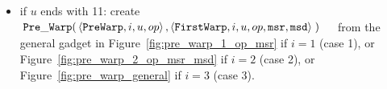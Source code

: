\begin{itemize}
\begin{itemize}
            \item if $u$ ends with 11:
            create
            $\begin{aligned}[t]
                {\tt Pre\_Warp}(& \left\langle {\tt PreWarp},   i, u, op \right\rangle,
                           \left\langle {\tt FirstWarp}, i, u, op, {\tt msr}, {\tt msd} \right\rangle \;)
            \end{aligned}$ from the general gadget in Figure~\ref{fig:pre_warp_1_op_msr} if $i = 1$ (case 1),
            or Figure~\ref{fig:pre_warp_2_op_msr_msd} if $i = 2$ (case 2), or Figure~\ref{fig:pre_warp_general} if $i = 3$ (case 3).
        \end{itemize}
        \vspace{.5cm}

        \begin{figure}[H]
            \centering
            {}%
            ~

\end{figure}
\end{itemize}
